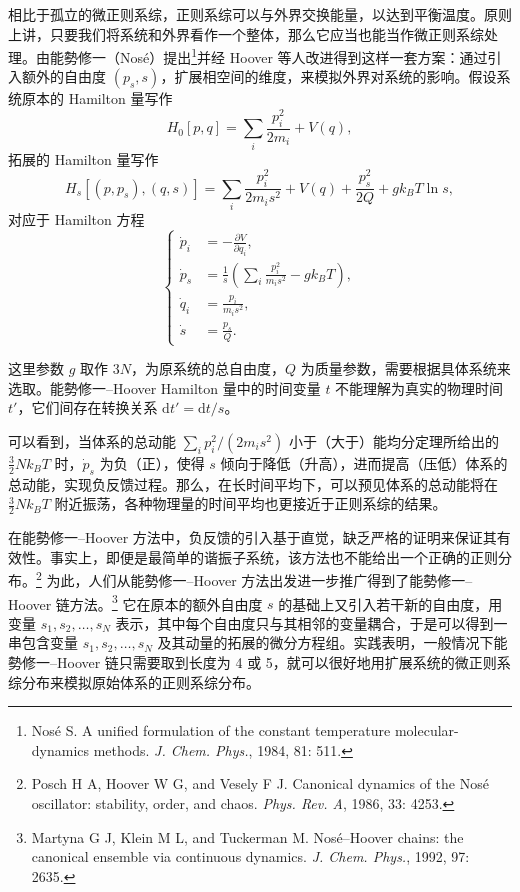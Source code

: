 相比于孤立的微正则系综，正则系综可以与外界交换能量，以达到平衡温度。原则上讲，只要我们将系统和外界看作一个整体，那么它应当也能当作微正则系综处理。由能勢修一（Nosé）提出\footnote{Nosé S. A unified formulation of the constant temperature molecular-dynamics methods. \emph{J. Chem. Phys.}, 1984, 81: 511.}并经 Hoover 等人改进得到这样一套方案：通过引入额外的自由度 $(p_s,s)$，扩展相空间的维度，来模拟外界对系统的影响。假设系统原本的 Hamilton 量写作
\begin{equation}
H_0[p,q]=\sum_i\frac{p_i^2}{2m_i}+V(q),
\tag{7.4.3}
\end{equation}
拓展的 Hamilton 量写作
\begin{equation}
H_s[(p,p_s),(q,s)]=\sum_i\frac{p_i^2}{2m_i s^2}+V(q)+\frac{p_s^2}{2Q}+gk_BT\ln s,
\tag{7.4.4}
\end{equation}
对应于 Hamilton 方程
\begin{equation}
\left\{
\begin{aligned}
\dot p_i&=-\frac{\partial V}{\partial q_i},\\
\dot p_s&=\frac1s\left(\sum_i\frac{p_i^2}{m_i s^2}-gk_BT\right),\\
\dot q_i&=\frac{p_i}{m_i s^2},\\
\dot s&=\frac{p_s}{Q}.
\end{aligned}
\right.
\tag{7.4.5}
\end{equation}

这里参数 $g$ 取作 $3N$，为原系统的总自由度，$Q$ 为质量参数，需要根据具体系统来选取。能勢修一--Hoover Hamilton 量中的时间变量 $t$ 不能理解为真实的物理时间 $t'$，它们间存在转换关系 $\mathrm dt'=\mathrm dt/s$。

可以看到，当体系的总动能 $\sum_i p_i^2/(2m_i s^2)$ 小于（大于）能均分定理所给出的 $\frac32Nk_BT$ 时，$\dot p_s$ 为负（正），使得 $s$ 倾向于降低（升高），进而提高（压低）体系的总动能，实现负反馈过程。那么，在长时间平均下，可以预见体系的总动能将在 $\frac32Nk_BT$ 附近振荡，各种物理量的时间平均也更接近于正则系综的结果。

在能勢修一--Hoover 方法中，负反馈的引入基于直觉，缺乏严格的证明来保证其有效性。事实上，即便是最简单的谐振子系统，该方法也不能给出一个正确的正则分布。\footnote{Posch H A, Hoover W G, and Vesely F J. Canonical dynamics of the Nosé oscillator: stability, order, and chaos. \emph{Phys. Rev. A}, 1986, 33: 4253.} 为此，人们从能勢修一--Hoover 方法出发进一步推广得到了能勢修一--Hoover 链方法。\footnote{Martyna G J, Klein M L, and Tuckerman M. Nosé--Hoover chains: the canonical ensemble via continuous dynamics. \emph{J. Chem. Phys.}, 1992, 97: 2635.} 它在原本的额外自由度 $s$ 的基础上又引入若干新的自由度，用变量 $s_1,s_2,\ldots,s_N$ 表示，其中每个自由度只与其相邻的变量耦合，于是可以得到一串包含变量 $s_1,s_2,\ldots,s_N$ 及其动量的拓展的微分方程组。实践表明，一般情况下能勢修一--Hoover 链只需要取到长度为 4 或 5，就可以很好地用扩展系统的微正则系综分布来模拟原始体系的正则系综分布。

